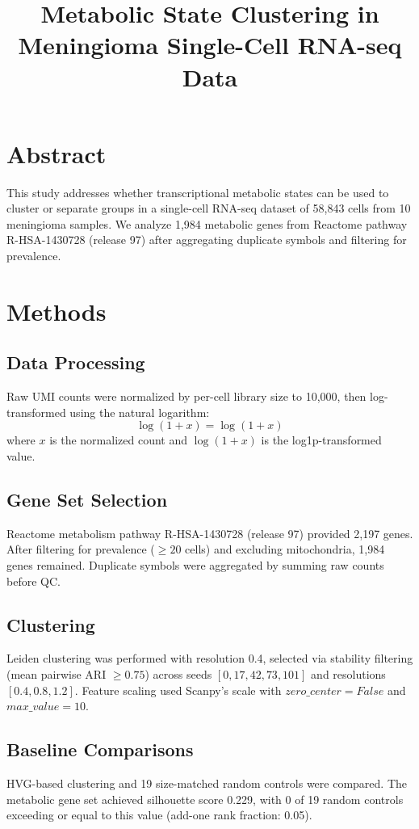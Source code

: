 \documentclass[11pt, a4paper]{article}
\title{\textbf{Metabolic State Clustering in Meningioma Single-Cell RNA-seq Data}}
\author{}
\date{}
\begin{document}
\maketitle

\section*{Abstract}
This study addresses whether transcriptional metabolic states can be used to cluster or separate groups in a single-cell RNA-seq dataset of 58,843 cells from 10 meningioma samples. We analyze 1,984 metabolic genes from Reactome pathway R-HSA-1430728 (release 97) after aggregating duplicate symbols and filtering for prevalence.

\section{Methods}
\subsection{Data Processing}
Raw UMI counts were normalized by per-cell library size to 10,000, then log-transformed using the natural logarithm:
\begin{equation}
\label{eq:log1p}
\log(1+x) = \log(1 + x)
\end{equation}
where $x$ is the normalized count and $\log(1+x)$ is the log1p-transformed value.

\subsection{Gene Set Selection}
Reactome metabolism pathway R-HSA-1430728 (release 97) provided 2,197 genes. After filtering for prevalence ($\ge 20$ cells) and excluding mitochondria, 1,984 genes remained. Duplicate symbols were aggregated by summing raw counts before QC.

\subsection{Clustering}
Leiden clustering was performed with resolution 0.4, selected via stability filtering (mean pairwise ARI $\ge 0.75$) across seeds $[0, 17, 42, 73, 101]$ and resolutions $[0.4, 0.8, 1.2]$. Feature scaling used Scanpy's scale with $zero\_center=False$ and $max\_value=10$.

\subsection{Baseline Comparisons}
HVG-based clustering and 19 size-matched random controls were compared. The metabolic gene set achieved silhouette score 0.229, with 0 of 19 random controls exceeding or equal to this value (add-one rank fraction: 0.05).
\end{document}
